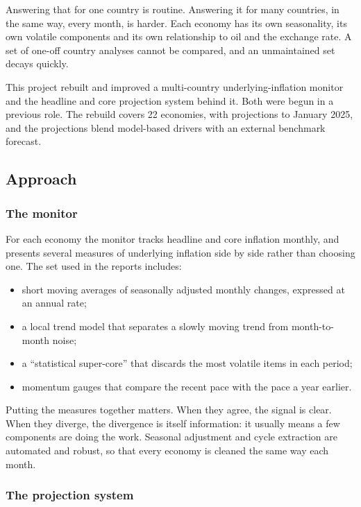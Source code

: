 \documentclass[
  british,
  a4paper,
]{article}
\providecommand{\tightlist}{%
  \setlength{\itemsep}{0pt}\setlength{\parskip}{0pt}}
\begin{document}
Answering that for one country is routine. Answering it for many
countries, in the same way, every month, is harder. Each economy has its
own seasonality, its own volatile components and its own relationship to
oil and the exchange rate. A set of one-off country analyses cannot be
compared, and an unmaintained set decays quickly.

This project rebuilt and improved a multi-country underlying-inflation
monitor and the headline and core projection system behind it. Both were
begun in a previous role. The rebuild covers 22 economies, with
projections to January 2025, and the projections blend model-based
drivers with an external benchmark forecast.

\subsection{Approach}\label{approach}

\subsubsection{The monitor}\label{the-monitor}

For each economy the monitor tracks headline and core inflation monthly,
and presents several measures of underlying inflation side by side
rather than choosing one. The set used in the reports includes:

\begin{itemize}
\tightlist
\item
  short moving averages of seasonally adjusted monthly changes,
  expressed at an annual rate;
\item
  a local trend model that separates a slowly moving trend from
  month-to-month noise;
\item
  a ``statistical super-core'' that discards the most volatile items in
  each period;
\item
  momentum gauges that compare the recent pace with the pace a year
  earlier.
\end{itemize}

Putting the measures together matters. When they agree, the signal is
clear. When they diverge, the divergence is itself information: it
usually means a few components are doing the work. Seasonal adjustment
and cycle extraction are automated and robust, so that every economy is
cleaned the same way each month.

\subsubsection{The projection system}\label{the-projection-system}
\end{document}
